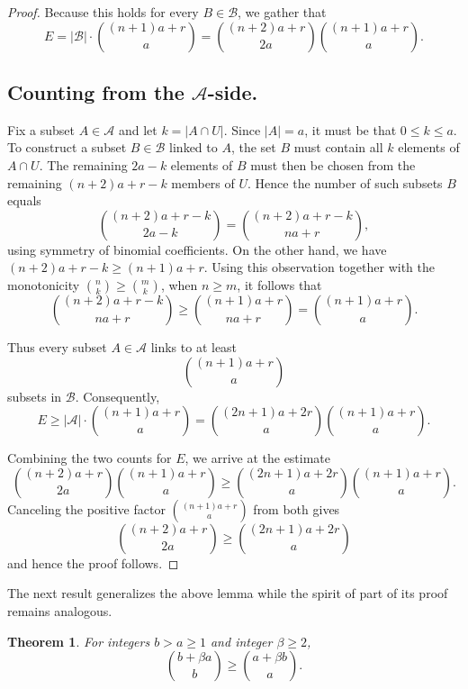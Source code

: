 \documentclass[11pt]{amsart}
\newtheorem{theorem}{Theorem} %
\begin{document}
\begin{proof}
Because this holds for every $B\in\mathcal{B}$, we gather that
$$E =|\mathcal{B}|\cdot \binom{(n+1)a+r}{a}
=
\binom{(n+2)a+r}{2a}\binom{(n+1)a+r}{a}.
$$

\subsection*{Counting from the $\mathcal{A}$-side.}
Fix a subset $A\in\mathcal{A}$ and let $k=|A\cap U|$. Since $|A|=a$, it must be that $0\leq k\leq a$.
To construct a subset $B\in\mathcal{B}$ linked to $A$, the set $B$ must contain all $k$ elements of $A\cap U$. 
The remaining $2a-k$ elements of $B$ must then be chosen from the remaining $(n+2)a+r-k$ members of $U$.
Hence the number of such subsets $B$ equals
$$\binom{(n+2)a+r-k}{2a-k}=\binom{(n+2)a+r-k}{na+r},$$
using symmetry of binomial coefficients. On the other hand, we have $(n+2)a+r-k \geq (n+1)a+r$. Using this observation together with the monotonicity $\binom{n}k\geq\binom{m}k$, when $n\geq m$, it follows that
$$\binom{(n+2)a+r-k}{na+r} \geq \binom{(n+1)a+r}{na+r}=\binom{(n+1)a+r}a.$$

Thus every subset $A\in\mathcal{A}$ links to at least
$$
\binom{(n+1)a+r}a
$$
subsets in $\mathcal{B}$. Consequently,
$$ E \geq |\mathcal{A}|\cdot \binom{(n+1)a+r}{a} = \binom{(2n+1)a+2r}a\binom{(n+1)a+r}a.$$

Combining the two counts for $E$, we arrive at the estimate
$$
\binom{(n+2)a+r}{2a}\binom{(n+1)a+r}a  \geq  \binom{(2n+1)a+2r}{a}\binom{(n+1)a+r}a.
$$
Canceling the positive factor $\binom{(n+1)a+r}a$ from both gives
$$
\binom{(n+2)a+r}{2a} \ge \binom{(2n+1)a+2r}a
$$
and hence the proof follows.
\end{proof}

The next result generalizes the above lemma while the spirit of part of its proof remains analogous.

\begin{theorem}
For integers $b> a \ge 1$ and integer $\beta\geq2$, 
$$\binom{b+\beta a}b \ge \binom{a+\beta b}{a}.$$
\end{theorem}
\end{document}
